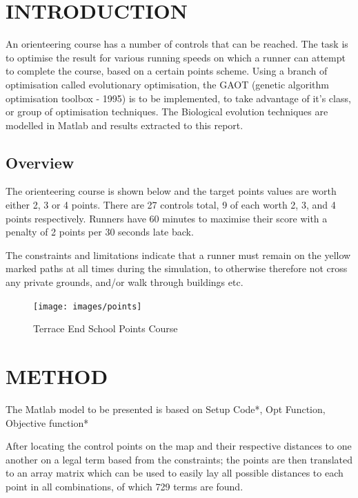 \documentclass[a4paper, 10pt]{IEEEconf}
\begin{document}
\section{INTRODUCTION}

An orienteering course has a number of controls that can be reached. The task is to optimise the result for various running speeds on which a runner can attempt to complete the course, based on a certain points scheme. Using a branch of optimisation called evolutionary optimisation, the GAOT (genetic algorithm optimisation toolbox - 1995) is to be implemented, to take advantage of it's class, or group of optimisation techniques. The Biological evolution techniques are modelled in Matlab and results extracted to this report.


\subsection{Overview}
The orienteering course is shown below and the target points values are worth either 2, 3 or 4 points. There are 27 controls total, 9 of each worth 2, 3, and 4 points respectively. Runners have 60 minutes to maximise their score with a penalty of 2 points per 30 seconds late back. 

The constraints and limitations indicate that a runner must remain on the yellow marked paths at all times during the simulation, to otherwise therefore not cross any private grounds, and/or walk through buildings etc. 

\begin{figure}[H]
  \texttt{[image: images/points]}
  \caption{Terrace End School Points Course}
  \label{fig:Terrace End School Points Course}
\end{figure}

\clearpage
\section{METHOD}

The Matlab model to be presented is based on Setup Code*, Opt Function, Objective function* 

After locating the control points on the map and their respective distances to one another on a legal term based from the constraints; the points are then translated to an array matrix which can be used to easily lay all possible distances to each point in all combinations, of which 729 terms are found.
\end{document}
